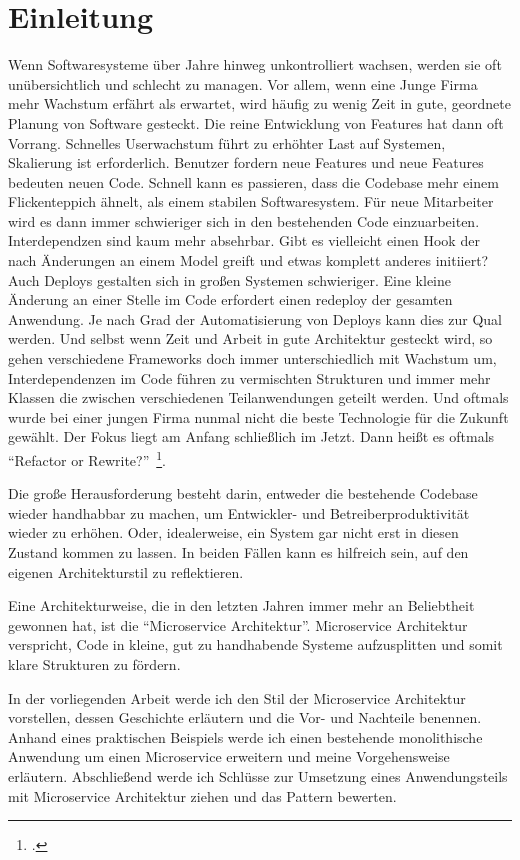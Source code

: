 \chapter{Einleitung}
Wenn Softwaresysteme über Jahre hinweg unkontrolliert wachsen, werden sie oft unübersichtlich und schlecht zu managen. Vor allem, wenn eine Junge Firma mehr Wachstum erfährt als erwartet, wird häufig zu wenig Zeit in gute, geordnete Planung von Software gesteckt. Die reine Entwicklung von Features hat dann oft Vorrang. Schnelles Userwachstum führt zu erhöhter Last auf Systemen, Skalierung ist erforderlich. Benutzer fordern neue Features und neue Features bedeuten neuen Code. Schnell kann es passieren, dass die Codebase mehr einem Flickenteppich ähnelt, als einem stabilen Softwaresystem. Für neue Mitarbeiter wird es dann immer schwieriger sich in den bestehenden Code einzuarbeiten. Interdependzen sind kaum mehr absehrbar. Gibt es vielleicht einen Hook der nach Änderungen an einem Model greift und etwas komplett anderes initiiert? Auch Deploys gestalten sich in großen Systemen schwieriger. Eine kleine Änderung an einer Stelle im Code erfordert einen redeploy der gesamten Anwendung. Je nach Grad der Automatisierung von Deploys kann dies zur Qual werden. Und selbst wenn Zeit und Arbeit in gute Architektur gesteckt wird, so gehen verschiedene Frameworks doch immer unterschiedlich mit Wachstum um, Interdependenzen im Code führen zu vermischten Strukturen und immer mehr Klassen die zwischen verschiedenen Teilanwendungen geteilt werden. Und oftmals wurde bei einer jungen Firma nunmal nicht die beste Technologie für die Zukunft gewählt. Der Fokus liegt am Anfang schließlich im Jetzt. Dann heißt es oftmals ``Refactor or Rewrite?''~\footcite[vgl.][]{refactorrewrite}.

Die große Herausforderung besteht darin, entweder die bestehende Codebase wieder handhabbar zu machen, um Entwickler- und Betreiberproduktivität wieder zu erhöhen. Oder, idealerweise, ein System gar nicht erst in diesen Zustand kommen zu lassen. In beiden Fällen kann es hilfreich sein, auf den eigenen Architekturstil zu reflektieren.

Eine Architekturweise, die in den letzten Jahren immer mehr an Beliebtheit gewonnen hat, ist die ``Microservice Architektur''. Microservice Architektur verspricht, Code in kleine, gut zu handhabende Systeme aufzusplitten und somit klare Strukturen zu fördern.

In der vorliegenden Arbeit werde ich den Stil der Microservice Architektur vorstellen, dessen Geschichte erläutern und die Vor- und Nachteile benennen. Anhand eines praktischen Beispiels werde ich einen bestehende monolithische Anwendung um einen Microservice erweitern und meine Vorgehensweise erläutern.
Abschließend werde ich Schlüsse zur Umsetzung eines Anwendungsteils mit Microservice Architektur ziehen und das Pattern bewerten.